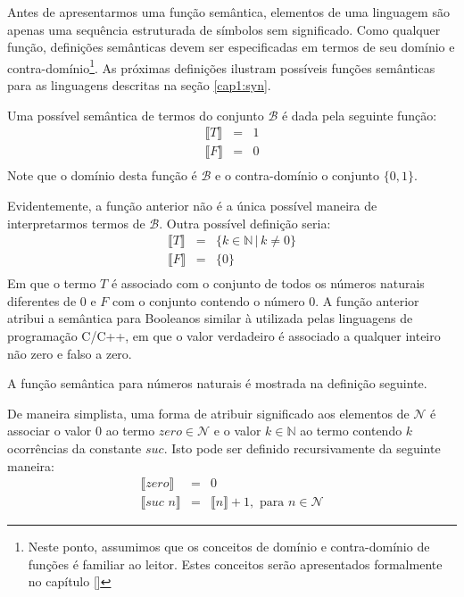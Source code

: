 Antes de apresentarmos uma fun\c{c}\~ao sem\^antica, elementos de uma linguagem s\~ao apenas uma sequ\^encia estruturada de s\'imbolos
sem significado. Como qualquer fun\c{c}\~ao, defini\c{c}\~oes sem\^anticas devem ser especificadas em termos de seu dom\'inio e 
contra-dom\'inio\footnote{Neste ponto, assumimos que os conceitos de dom\'inio e contra-dom\'inio de fun\c{c}\~oes \'e familiar ao leitor.
Estes conceitos ser\~ao apresentados formalmente no cap\'itulo \ref{}}. As pr\'oximas defini\c{c}\~oes ilustram poss\'iveis fun\c{c}\~oes 
sem\^anticas para as linguagens descritas na se\c{c}\~ao \ref{cap1:syn}.

\begin{Definition}
Uma poss\'ivel sem\^antica de termos do conjunto $\mathcal{B}$ \'e dada pela seguinte fun\c{c}\~ao:
\[
\begin{array}{lcl}
\llbracket T \rrbracket & = & 1\\
\llbracket F \rrbracket & = & 0\\
\end{array}
\]
Note que o dom\'inio desta fun\c{c}\~ao \'e $\mathcal{B}$ e o contra-dom\'inio o conjunto $\{0,1\}$.
\end{Definition}
Evidentemente, a fun\c{c}\~ao anterior n\~ao \'e a \'unica poss\'ivel maneira de interpretarmos termos de $\mathcal{B}$.
Outra poss\'ivel defini\c{c}\~ao seria:
\[
\begin{array}{lcl}
\llbracket T \rrbracket & = & \{k\in\mathbb{N}\,|\,k\neq 0\}\\
\llbracket F \rrbracket & = & \{0\}\\
\end{array}
\]
Em que o termo $T$ \'e associado com o conjunto de todos os n\'umeros naturais diferentes de $0$ e $F$ com o conjunto contendo 
o n\'umero $0$. A fun\c{c}\~ao anterior atribui a sem\^antica para Booleanos similar \`a utilizada pelas linguagens de programa\c{c}\~ao
C/C++, em que o valor verdadeiro \'e associado a qualquer inteiro n\~ao zero e falso a zero.

A fun\c{c}\~ao sem\^antica para n\'umeros naturais \'e mostrada na defini\c{c}\~ao seguinte.

\begin{Definition}
De maneira simplista, uma forma de atribuir significado aos elementos de $\mathcal{N}$ \'e associar o valor $0$ ao termo $zero\in\mathcal{N}$
e o valor $k\in\mathbb{N}$ ao termo contendo $k$ ocorr\^encias da constante $suc$. Isto pode ser definido recursivamente da seguinte maneira:
\[
\begin{array}{lcl}
\llbracket zero \rrbracket & = & 0\\
\llbracket suc\,\,n\rrbracket & = & \llbracket n \rrbracket + 1, \text{ para }n\in\mathcal{N}
\end{array}
\]
\end{Definition}

